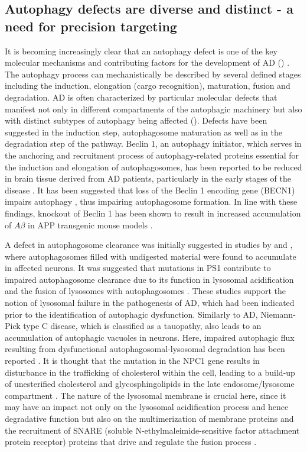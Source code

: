 \subsection{Autophagy defects are diverse and distinct - a need for precision targeting}
It is becoming increasingly clear that an autophagy defect is one of the key molecular mechanisms and contributing factors for the development of AD () \citep{Nixon2005,Nixon2011}. The autophagy process can mechanistically be described by several defined stages including the induction, elongation (cargo recognition), maturation, fusion and degradation. AD is often characterized by particular molecular defects that manifest not only in different compartments of the autophagic machinery but also with distinct subtypes of autophagy being affected (). Defects have been suggested in the induction step, autophagosome maturation as well as in the degradation step of the pathway. Beclin 1, an autophagy initiator, which serves in the anchoring and recruitment process of autophagy-related proteins essential for the induction and elongation of autophagosomes, has been reported to be reduced in brain tissue derived from AD patients, particularly in the early stages of the disease \citep{Pickford2008}. It has been suggested that loss of the Beclin 1 encoding gene (BECN1) impairs autophagy \citep{Frake2015,Pickford2008}, thus impairing autophagosome formation. In line with these findings, knockout of Beclin 1 has been shown to result in increased accumulation of $A\beta$ in APP transgenic mouse models \citep{Pickford2008}.

A defect in autophagosome clearance was initially suggested in studies by \citet{Nixon2005} and \citet{Boland2008}, where autophagosomes filled with undigested material were found to accumulate in affected neurons. It was suggested that mutations in PS1 contribute to impaired autophagosome clearance due to its function in lysosomal acidification and the fusion of lysosomes with autophagosomes \citep{Lee2010,Neely2011}. These studies support the notion of lysosomal failure in the pathogenesis of AD, which had been indicated prior to the identification of autophagic dysfunction. Similarly to AD, Niemann-Pick type C disease, which is classified as a tauopathy, also leads to an accumulation of autophagic vacuoles in neurons. Here, impaired autophagic flux resulting from dysfunctional autophagosomal-lysosomal degradation has been reported \citep{Elrick2012,German2001,Meske2016}. It is thought that the mutation in the NPC1 gene results in disturbance in the trafficking of cholesterol within the cell, leading to a build-up of unesterified cholesterol and glycosphingolipids in the late endosome/lysosome compartment \citep{Elrick2012,Meske2016,Nixon2004}. The nature of the lysosomal membrane is crucial here, since it may have an impact not only on the lysosomal acidification process and hence degradative function but also on the multimerization of membrane proteins and the recruitment of SNARE (soluble N-ethylmaleimide-sensitive factor attachment protein receptor) proteins that drive and regulate the fusion process \citep{Itakura2012}.

